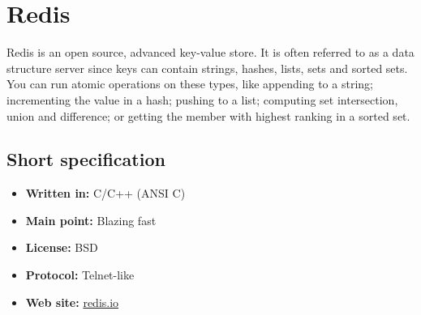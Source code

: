 \chapter{Redis}

Redis is an open source, advanced key-value store. It is often referred to as a data structure server since keys can contain strings, hashes, lists, sets and sorted sets.
You can run atomic operations on these types, like appending to a string; incrementing the value in a hash; pushing to a list; computing set intersection, union and difference; or getting the member with highest ranking in a sorted set.

\section{Short specification}

\begin{itemize}
  \item \textbf{Written in:} C/C++ (ANSI C)
  \item \textbf{Main point:} Blazing fast
  \item \textbf{License:} BSD
  \item \textbf{Protocol:} Telnet-like
  \item \textbf{Web site:} \href{http://redis.io}{redis.io}
\end{itemize}